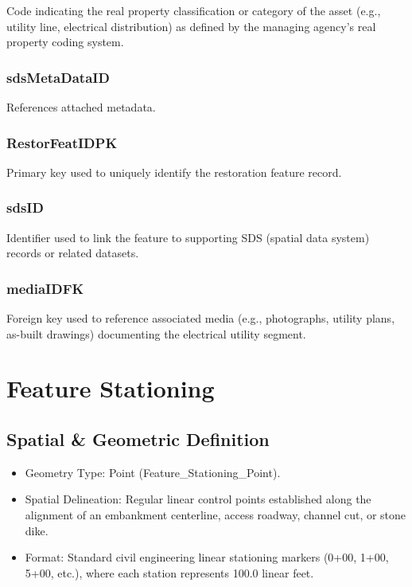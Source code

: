 \documentclass[
  letterpaper,
  DIV=11,
  numbers=noendperiod]{scrreprt}
\begin{document}
Code indicating the real property classification or category of the
asset (e.g., utility line, electrical distribution) as defined by the
managing agency's real property coding system.

\subsection{sdsMetaDataID}\label{sdsmetadataid-20}

References attached metadata.

\subsection{RestorFeatIDPK}\label{restorfeatidpk-20}

Primary key used to uniquely identify the restoration feature record.

\subsection{sdsID}\label{sdsid-20}

Identifier used to link the feature to supporting SDS (spatial data
system) records or related datasets.

\subsection{mediaIDFK}\label{mediaidfk-20}

Foreign key used to reference associated media (e.g., photographs,
utility plans, as-built drawings) documenting the electrical utility
segment.

\chapter{Feature Stationing}\label{feature-stationing}

\section{Spatial \& Geometric
Definition}\label{spatial-geometric-definition-21}

\begin{itemize}
\item
  Geometry Type: Point (Feature\_Stationing\_Point).
\item
  Spatial Delineation: Regular linear control points established along
  the alignment of an embankment centerline, access roadway, channel
  cut, or stone dike.
\item
  Format: Standard civil engineering linear stationing markers (0+00,
  1+00, 5+00, etc.), where each station represents 100.0 linear feet.
\end{itemize}
\end{document}
